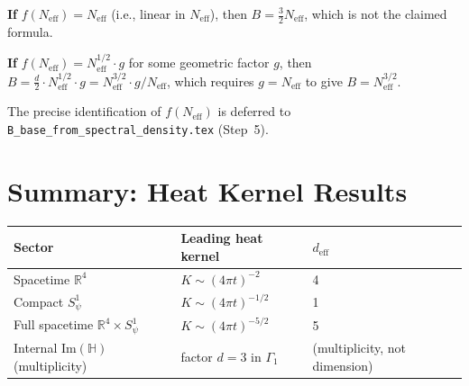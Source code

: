 \documentclass[11pt,a4paper]{article}
\theoremstyle{definition}
\theoremstyle{remark}
\begin{document}
\textbf{If} $f(N_{\mathrm{eff}}) = N_{\mathrm{eff}}$ (i.e., linear in $N_{\mathrm{eff}}$),
then $B = \frac{3}{2} N_{\mathrm{eff}}$, which is not the claimed formula.

\textbf{If} $f(N_{\mathrm{eff}}) = N_{\mathrm{eff}}^{1/2} \cdot g$
for some geometric factor $g$,
then $B = \frac{d}{2} \cdot N_{\mathrm{eff}}^{1/2} \cdot g
= N_{\mathrm{eff}}^{3/2} \cdot g/N_{\mathrm{eff}}$,
which requires $g = N_{\mathrm{eff}}$ to give $B = N_{\mathrm{eff}}^{3/2}$.

The precise identification of $f(N_{\mathrm{eff}})$ is deferred to
\texttt{B\_base\_from\_spectral\_density.tex} (Step~5).

\section{Summary: Heat Kernel Results}
\label{sec:summary}

\begin{center}
\begin{tabular}{lll}
  \toprule
  Sector & Leading heat kernel & $d_{\mathrm{eff}}$ \\
  \midrule
  Spacetime $\mathbb{R}^4$ & $K \sim (4\pi t)^{-2}$ & 4 \\
  Compact $S^1_\psi$ & $K \sim (4\pi t)^{-1/2}$ & 1 \\
  Full spacetime $\mathbb{R}^4 \times S^1_\psi$ & $K \sim (4\pi t)^{-5/2}$ & 5 \\
  Internal $\mathrm{Im}(\mathbb{H})$ (multiplicity) & factor $d = 3$ in $\Gamma_1$ & (multiplicity, not dimension) \\
  \bottomrule
\end{tabular}
\end{center}
\end{document}
